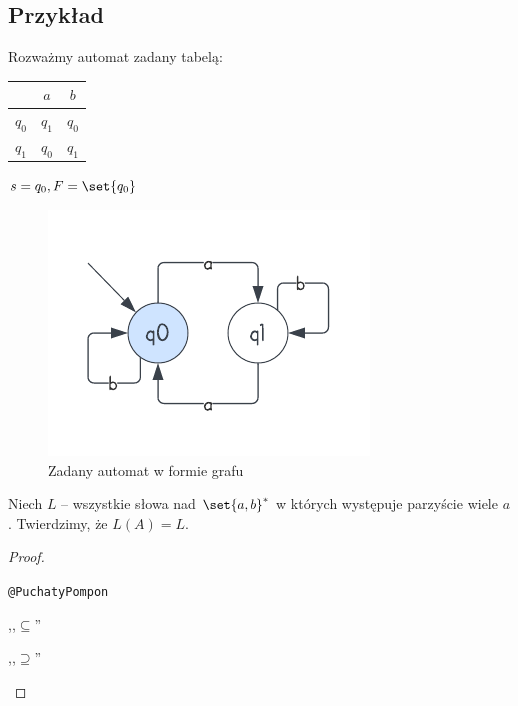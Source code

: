 \subsection{Przykład}
Rozważmy automat zadany tabelą:
\begin{center}
	\begin{tabular}{c|c c}
		        & \(a\)   & \(b\)   \\
		\hline
		\(q_0\) & \(q_1\) & \(q_0\) \\
		\(q_1\) & \(q_0\) & \(q_1\) \\
	\end{tabular}
\end{center}
\( s = q_0, F = \set{q_0} \)

\begin{figure}[H]
	\centering
	\includegraphics[scale=0.75]{img/even-a-automaton.png}
	\caption{Zadany automat w formie grafu}
\end{figure}


Niech \( L \) -- wszystkie słowa nad \( \set{a, b}^* \) w których występuje parzyście wiele \( a \).
Twierdzimy, że \( L(A) = L \).

\begin{proof} \( \)

	\texttt{@PuchatyPompon}

	\begin{description}
		\item ,,\(\subseteq\)''

		\item ,,\(\supseteq\)''
	\end{description}
\end{proof}